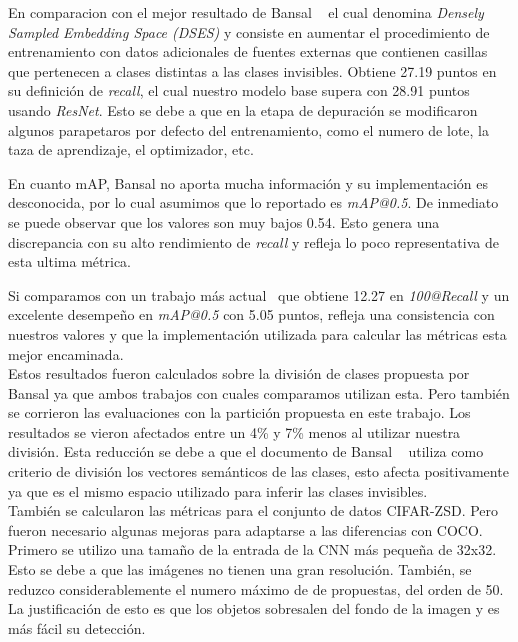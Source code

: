 En comparacion con el mejor resultado de Bansal \etal~\cite{bansal2018zero} el cual denomina \textit{Densely Sampled Embedding Space (DSES)} y consiste en aumentar el procedimiento de entrenamiento con datos adicionales de fuentes externas que contienen casillas que pertenecen a clases distintas a las clases invisibles. Obtiene 27.19 puntos en su definición de \textit{recall}, el cual nuestro modelo base supera con 28.91 puntos usando \textit{ResNet}. Esto se debe a que en la etapa de depuración se modificaron algunos parapetaros por defecto del entrenamiento, como el numero de lote, la taza de aprendizaje, el optimizador, etc.  

En cuanto mAP, Bansal no aporta mucha información y su implementación es desconocida, por lo cual asumimos que lo reportado es \textit{mAP@0.5}. De inmediato se puede observar que los valores son muy bajos 0.54. Esto genera una discrepancia con su alto rendimiento de \textit{recall} y refleja lo poco representativa de esta ultima métrica. 

Si comparamos con un trabajo más actual~\cite{rahman2020zero} que obtiene 12.27 en \textit{100@Recall} y un excelente desempeño en \textit{mAP@0.5} con 5.05 puntos, refleja una consistencia con nuestros valores y que la implementación utilizada para calcular las métricas esta mejor encaminada.\\
	

Estos resultados fueron calculados sobre la división de clases propuesta por Bansal ya que ambos trabajos con cuales comparamos utilizan esta. Pero también se corrieron las evaluaciones con la partición propuesta en este trabajo. Los resultados se vieron afectados entre un 4\% y 7\% menos al utilizar nuestra división. Esta reducción se debe a que el documento de Bansal \etal~\cite{bansal2018zero} utiliza como criterio de división los vectores semánticos de las clases, esto afecta positivamente ya que es el mismo espacio utilizado para inferir las clases invisibles.\\

También se calcularon las métricas para el conjunto de datos CIFAR-ZSD. Pero fueron necesario algunas mejoras para adaptarse a las diferencias con COCO. Primero se utilizo una tamaño de la entrada de la CNN más pequeña de 32x32. Esto se debe a que las imágenes no tienen una gran resolución. También, se reduzco considerablemente el numero máximo de de propuestas, del orden de 50. La justificación de esto es que los objetos sobresalen del fondo de la imagen y es más fácil su detección.

